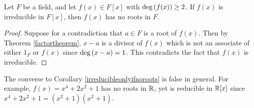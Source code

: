 \documentclass[11pt,fleqn,dvipsnames,usenames]{article}
\begin{document}
%
\begin{corollary}\label{irreducibleonlyifnoroots}
Let $F$ be a field, and let $f(x)\in F[x]$ with $\text{deg}\left(f(x)\right)\geq 2$.  If $f(x)$ is irreducible in $F[x]$, then $f(x)$ has no roots in $F$.
\end{corollary}
%
\begin{proof}
Suppose for a contradiction that $a\in F$ is a root of $f(x)$.  Then by Theorem \ref{factortheorem}, $x - a$ is a divisor of $f(x)$ which is not an associate of either $1_{F}$ or $f(x)$ since $\text{deg}\left(x - a\right) = 1$.  This contradicts the fact that $f(x)$ is irreducible.
\end{proof}
%
\begin{remark} The converse to Corollary \ref{irreducibleonlyifnoroots} is false in general.  For example, $f(x) = x^4 + 2x^2 + 1$ has no roots in $\mathbb{R}$, yet is reducible in $\mathbb{R}[x]$ since $x^4 + 2x^2 + 1 = (x^2 + 1)(x^2 + 1)$.
\end{remark}
\vsp
\end{document}
